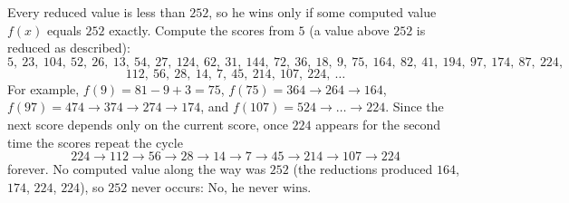 Every reduced value is less than $252$, so he wins only if some computed value $f(x)$ equals $252$ exactly. Compute the scores from $5$ (a value above $252$ is reduced as described):
\[5,\ 23,\ 104,\ 52,\ 26,\ 13,\ 54,\ 27,\ 124,\ 62,\ 31,\ 144,\ 72,\ 36,\ 18,\ 9,\ 75,\ 164,\ 82,\ 41,\ 194,\ 97,\ 174,\ 87,\ 224,\]
\[112,\ 56,\ 28,\ 14,\ 7,\ 45,\ 214,\ 107,\ 224,\ \dots\]
For example, $f(9)=81-9+3=75$, $f(75)=364\to264\to164$, $f(97)=474\to374\to274\to174$, and $f(107)=524\to\dots\to224$. Since the next score depends only on the current score, once $224$ appears for the second time the scores repeat the cycle
\[224\to112\to56\to28\to14\to7\to45\to214\to107\to224\]
forever. No computed value along the way was $252$ (the reductions produced $164$, $174$, $224$, $224$), so $252$ never occurs: $\boxed{\text{No, he never wins}}$.
